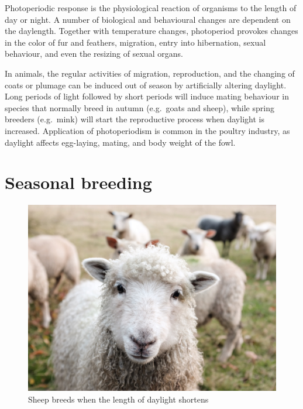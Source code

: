\documentclass[]{book}
\begin{document}
Photoperiodic response is the physiological reaction of organisms to the length of day or night. A number of biological and behavioural changes are dependent on the daylength. Together with temperature changes, photoperiod provokes changes in the color of fur and feathers, migration, entry into hibernation, sexual behaviour, and even the resizing of sexual organs.

In animals, the regular activities of migration, reproduction, and the changing of coats or plumage can be induced out of season by artificially altering daylight. Long periods of light followed by short periods will induce mating behaviour in species that normally breed in autumn (e.g.~goats and sheep), while spring breeders (e.g.~mink) will start the reproductive process when daylight is increased. Application of photoperiodism is common in the poultry industry, as daylight affects egg-laying, mating, and body weight of the fowl.

\hypertarget{seasonal-breeding}{%
\section{Seasonal breeding}\label{seasonal-breeding}}

\begin{figure}

{\centering \includegraphics[width=1\linewidth]{figures/sheep} 

}

\caption{Sheep breeds when the length of daylight shortens}\label{fig:sheep}
\end{figure}
\end{document}

